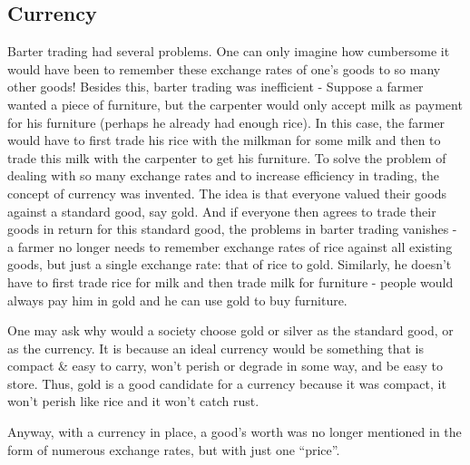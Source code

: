 \subsection{Currency}
Barter trading had several problems. One can only imagine how cumbersome it would have been to remember these exchange rates of one's goods to so many other goods! Besides this, barter trading was inefficient - Suppose a farmer wanted a piece of furniture, but the carpenter would only accept milk as payment for his furniture (perhaps he already had enough rice). In this case, the farmer would have to first trade his rice with the milkman for some milk and then to trade this milk with the carpenter to get his furniture. To solve the problem of dealing with so many exchange rates and to increase efficiency in trading, the concept of currency was invented. The idea is that everyone valued their goods against a standard good, say gold. And if everyone then agrees to trade their goods in return for this standard good, the problems in barter trading vanishes - a farmer no longer needs to remember exchange rates of rice against all existing goods, but just a single exchange rate: that of rice to gold. Similarly, he doesn't have to first trade rice for milk and then trade milk for furniture - people would always pay him in gold and he can use gold to buy furniture.

One may ask why would a society choose gold or silver as the standard good, or as the currency. It is because an ideal currency would be something that is compact \& easy to carry, won't perish or degrade in some way, and be easy to store. Thus, gold is a good candidate for a currency because it was compact, it won't perish like rice and it won't catch rust.

Anyway, with a currency in place, a good's worth was no longer mentioned in the form of numerous exchange rates, but with just one ``price''. 
